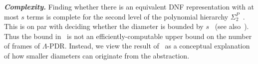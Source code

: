 \documentclass[acmsmall,screen]{acmart}
\newcommand{\para}[1]{\vspace{2pt}\noindent\textbf{\textit{#1.}}}
\newcommand{\psigma}[1]{\Sigma_{#1}^{P}}
\begin{document}
%
%
%

%
%
%
%

%
%
%
%
%
%
%

%
%
%
%
%
%
%
%
%
%
%
%

%
%
%
%
%
%
%
%
%
%

%
%
%

%
%
%
%
%

%

%
%

%
%
%
%
%

\para{Complexity}
%
%
%
%
%
%
%
Finding whether there is an equivalent DNF representation with at most $s$ terms is complete for the second level of the polynomial hierarchy $\psigma{2}$~\cite{DBLP:journals/jcss/Umans01}.
%
This is on par with deciding whether the diameter is bounded by $s$~\cite{DBLP:journals/tcs/HemaspaandraHTW10} (see also~\cite{schaefer2002completeness}).
Thus the bound in~ is not an efficiently-computable upper bound on the number of frames of $\Lambda$-PDR. Instead, we view the result of~ as a conceptual explanation of how smaller diameters can originate from the abstraction.
\end{document}
